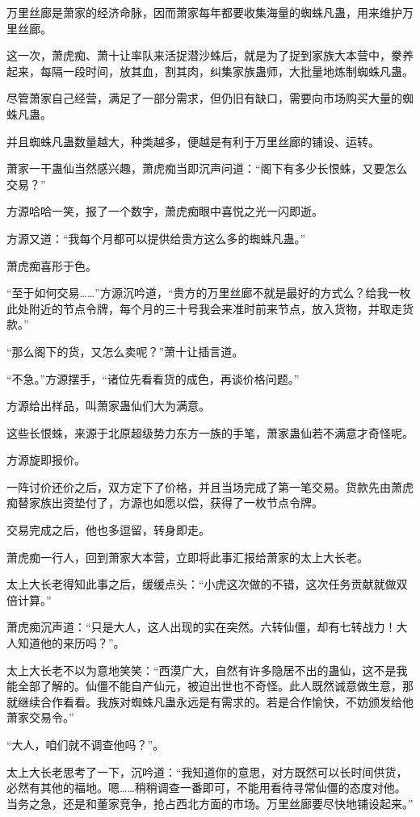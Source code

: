\begin{this_body}
万里丝廊是萧家的经济命脉，因而萧家每年都要收集海量的蜘蛛凡蛊，用来维护万里丝廊。

这一次，萧虎痴、萧十让率队来活捉潜沙蛛后，就是为了捉到家族大本营中，豢养起来，每隔一段时间，放其血，割其肉，纠集家族蛊师，大批量地炼制蜘蛛凡蛊。

尽管萧家自己经营，满足了一部分需求，但仍旧有缺口，需要向市场购买大量的蜘蛛凡蛊。

并且蜘蛛凡蛊数量越大，种类越多，便越是有利于万里丝廊的铺设、运转。

萧家一干蛊仙当然感兴趣，萧虎痴当即沉声问道：“阁下有多少长恨蛛，又要怎么交易？”

方源哈哈一笑，报了一个数字，萧虎痴眼中喜悦之光一闪即逝。

方源又道：“我每个月都可以提供给贵方这么多的蜘蛛凡蛊。”

萧虎痴喜形于色。

“至于如何交易……”方源沉吟道，“贵方的万里丝廊不就是最好的方式么？给我一枚此处附近的节点令牌，每个月的三十号我会来准时前来节点，放入货物，并取走货款。”

“那么阁下的货，又怎么卖呢？”萧十让插言道。

“不急。”方源摆手，“诸位先看看货的成色，再谈价格问题。”

方源给出样品，叫萧家蛊仙们大为满意。

这些长恨蛛，来源于北原超级势力东方一族的手笔，萧家蛊仙若不满意才奇怪呢。

方源旋即报价。

一阵讨价还价之后，双方定下了价格，并且当场完成了第一笔交易。货款先由萧虎痴替家族出资垫付了，方源也如愿以偿，获得了一枚节点令牌。

交易完成之后，他也多逗留，转身即走。

萧虎痴一行人，回到萧家大本营，立即将此事汇报给萧家的太上大长老。

太上大长老得知此事之后，缓缓点头：“小虎这次做的不错，这次任务贡献就做双倍计算。”

萧虎痴沉声道：“只是大人，这人出现的实在突然。六转仙僵，却有七转战力！大人知道他的来历吗？”。

太上大长老不以为意地笑笑：“西漠广大，自然有许多隐居不出的蛊仙，这不是我能全部了解的。仙僵不能自产仙元，被迫出世也不奇怪。此人既然诚意做生意，那就继续合作看看。我族对蜘蛛凡蛊永远是有需求的。若是合作愉快，不妨颁发给他萧家交易令。”

“大人，咱们就不调查他吗？”。

太上大长老思考了一下，沉吟道：“我知道你的意思，对方既然可以长时间供货，必然有其他的福地。嗯……稍稍调查一番即可，不能用看待寻常仙僵的态度对他。当务之急，还是和董家竞争，抢占西北方面的市场。万里丝廊要尽快地铺设起来。”


\end{this_body}
